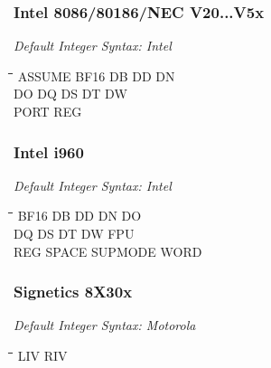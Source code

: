 \subsubsection{Intel 8086/80186/NEC V20...V5x}

{\em Default Integer Syntax: Intel}

{\tt\begin{tabbing}
\hspace{3cm}\=\hspace{3cm}\=\hspace{3cm}\=\hspace{3cm}\=\kill
ASSUME     \> BF16        \> DB          \> DD          \> DN \\
DO         \> DQ          \> DS          \> DT          \> DW \\
PORT       \> REG \\
\end{tabbing}}

\subsubsection{Intel i960}

{\em Default Integer Syntax: Intel}

{\tt\begin{tabbing}
\hspace{3cm}\=\hspace{3cm}\=\hspace{3cm}\=\hspace{3cm}\=\kill    
BF16       \> DB          \> DD          \> DN          \> DO \\
DQ         \> DS          \> DT          \> DW          \> FPU \\
REG        \> SPACE       \> SUPMODE     \> WORD \\
\end{tabbing}}

\subsubsection{Signetics 8X30x}

{\em Default Integer Syntax: Motorola}

{\tt\begin{tabbing}
\hspace{3cm}\=\hspace{3cm}\=\hspace{3cm}\=\hspace{3cm}\=\kill
LIV        \> RIV         \\   
\end{tabbing}}

